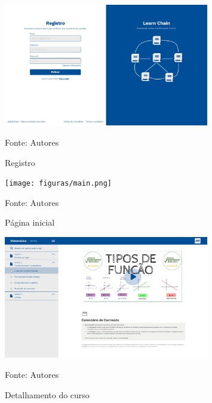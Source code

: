 \begin{apendicesenv}
    \begin{figure}[h]
        \centering
        \caption{Registro}
        \includegraphics[width=0.8\textwidth]{figuras/Registro.png}
        \begin{center}
            {\footnotesize Fonte: Autores}
        \end{center}
        \label{fig:Registro}
    \end{figure}

    \begin{figure}[h]
        \centering
        \caption{Página inicial}
        \texttt{[image: figuras/main.png]}
        \begin{center}
            {\footnotesize Fonte: Autores}
        \end{center}
        \label{fig:main}
    \end{figure}

    \begin{figure}[h]
        \centering
        \caption{Detalhamento do curso}
        \includegraphics[width=0.8\textwidth]{figuras/detalhamento_do_curso.png}
        \begin{center}
            {\footnotesize Fonte: Autores}
        \end{center}
        \label{fig:detalhamento_do_curso}
    \end{figure}


\end{apendicesenv}
